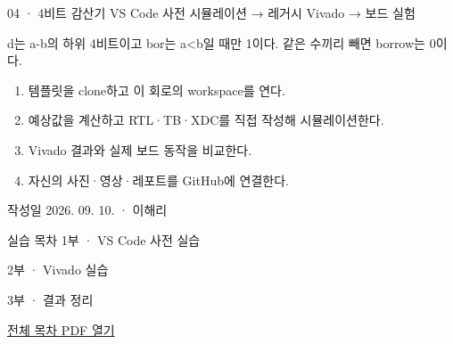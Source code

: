 
\renewcommand{\labonehome}{\hyperlink{legacy-04-contents}{\contentsbutton}}
\renewcommand{\legacySource}[1]{}
\providecommand{\terminalbox}[1]{\par\vspace{0.15cm}{\setlength{\fboxsep}{7pt}\colorbox{black}{\parbox{\dimexpr\textwidth-14pt\relax}{\color{white}\ttfamily\fontsize{7}{9}\selectfont #1}}}\par\vspace{0.15cm}}

\begingroup
\renewcommand{\small}{\fontsize{9}{11}\selectfont}
\begin{frame}{04 · 4비트 감산기}\relax
\small
VS Code 사전 시뮬레이션 → 레거시 Vivado → 보드 실험\par\vspace{0.22cm}d는 a-b의 하위 4비트이고 bor는 a<b일 때만 1이다. 같은 수끼리 빼면 borrow는 0이다.\par\begin{enumerate}\setlength{\itemsep}{0.22cm}
\item 템플릿을 clone하고 이 회로의 workspace를 연다.
\item 예상값을 계산하고 RTL·TB·XDC를 직접 작성해 시뮬레이션한다.
\item Vivado 결과와 실제 보드 동작을 비교한다.
\item 자신의 사진·영상·레포트를 GitHub에 연결한다.
\end{enumerate}
작성일 2026. 09. 10. · 이해리\par
\end{frame}

\begin{frame}[label=legacy-04-contents]{실습 목차}\relax
\small
1부 · VS Code 사전 실습\par{}\par\vspace{0.2cm}
\par\vspace{0.4cm}
2부 · Vivado 실습\par{}\par\vspace{0.4cm}
3부 · 결과 정리\par{}\par\vspace{0.35cm}
\href{04.LAB1_00_CONTENTS.pdf}{전체 목차 PDF 열기}
\end{frame}

